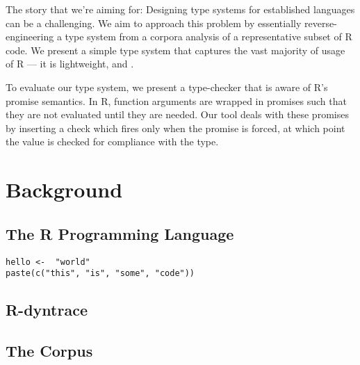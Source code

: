 \documentclass[acmsmall,review,anonymous]{acmart}\settopmatter{printfolios=true,printccs=false,printacmref=false}
\begin{document}
The story that we're aiming for:
Designing type systems for established languages can be a challenging.
We aim to approach this problem by essentially reverse-engineering a type system from a corpora analysis of a representative subset of R code.
We present a simple type system that captures the vast majority of usage of R --- it is lightweight, and .

To evaluate our type system, we present a type-checker that is aware of R's promise semantics. 
In R, function arguments are wrapped in promises such that they are not evaluated until they are needed.
Our tool deals with these promises by inserting a check which fires only when the promise is forced, at which point the value is checked for compliance with the type.


\section{Background}


\subsection{The R Programming Language}


\begin{lstlisting}
hello <-  "world"
paste(c("this", "is", "some", "code"))
\end{lstlisting}

\subsection{R-dyntrace}
\label{sec:r-dyntrace}


\subsection{The Corpus}

\end{document}
